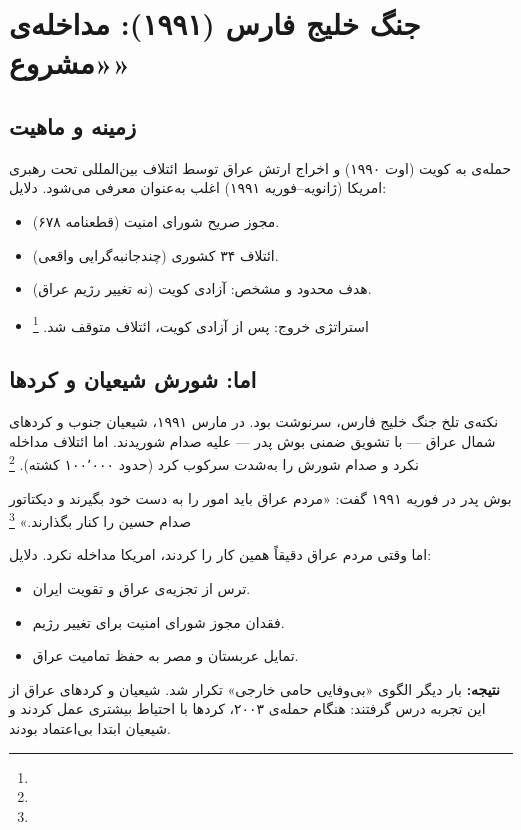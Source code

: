 \section{جنگ خلیج فارس (۱۹۹۱): مداخله‌ی «مشروع»}
\label{sec:ch10-gulf-war}

\subsection{زمینه و ماهیت}

حمله‌ی  به کویت (اوت ۱۹۹۰) و اخراج ارتش عراق توسط ائتلاف بین‌المللی تحت رهبری امریکا (ژانویه–فوریه ۱۹۹۱) اغلب به‌عنوان  معرفی می‌شود. دلایل:

\begin{itemize}[nosep, rightmargin=1em]
  \item مجوز صریح شورای امنیت (قطعنامه ۶۷۸).
  \item ائتلاف ۳۴ کشوری (چندجانبه‌گرایی واقعی).
  \item هدف محدود و مشخص: آزادی کویت (نه تغییر رژیم عراق).
  \item استراتژی خروج: پس از آزادی کویت، ائتلاف متوقف شد.%
  \footnote{}
\end{itemize}

\subsection{اما: شورش شیعیان و کردها}

نکته‌ی تلخ جنگ خلیج فارس، سرنوشت  بود. در مارس ۱۹۹۱، شیعیان جنوب و کردهای شمال عراق — با تشویق ضمنی بوش پدر — علیه صدام شوریدند. اما ائتلاف مداخله نکرد و صدام شورش را به‌شدت سرکوب کرد (حدود ۱۰۰٬۰۰۰ کشته).%
\footnote{}

\begin{tcolorbox}[enemybox, title={درس تاریخی: وعده‌ی مداخله بدون عمل}]
بوش پدر در فوریه ۱۹۹۱ گفت: «مردم عراق باید امور را به دست خود بگیرند و دیکتاتور صدام حسین را کنار بگذارند.»%
\footnote{}

اما وقتی مردم عراق دقیقاً همین کار را کردند، امریکا مداخله نکرد. دلایل:
\begin{itemize}[nosep, rightmargin=1em]
  \item ترس از تجزیه‌ی عراق و تقویت ایران.
  \item فقدان مجوز شورای امنیت برای تغییر رژیم.
  \item تمایل عربستان و مصر به حفظ تمامیت عراق.
\end{itemize}

\textbf{نتیجه:} بار دیگر الگوی «بی‌وفایی حامی خارجی» تکرار شد. شیعیان و کردهای عراق از این تجربه درس گرفتند: هنگام حمله‌ی ۲۰۰۳، کردها با احتیاط بیشتری عمل کردند و شیعیان ابتدا بی‌اعتماد بودند.
\end{tcolorbox}

